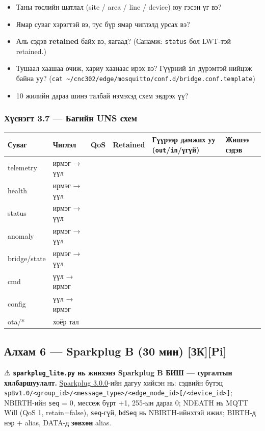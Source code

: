 \begin{itemize}
\tightlist
\item
  Таны төслийн шатлал (site / area / line / device) юу гэсэн үг вэ?
\item
  Ямар суваг хэрэгтэй вэ, тус бүр ямар чиглэлд урсах вэ?
\item
  Аль сэдэв \textbf{retained} байх вэ, яагаад? (Санамж: \texttt{status} бол LWT-тэй retained.)
\item
  Тушаал хаашаа очиж, хариу хаанаас ирэх вэ? Гүүрний \texttt{in} дүрэмтэй нийцэж байна уу? (\texttt{cat\ \textasciitilde{}/cnc302/edge/mosquitto/conf.d/bridge.conf.template})
\item
  10 жилийн дараа шинэ талбай нэмэхэд схем эвдрэх үү?
\end{itemize}

\hypertarget{ux445ux4afux441ux43dux44dux433ux442-3.7-ux431ux430ux433ux438ux439ux43d-uns-ux441ux445ux435ux43c}{%
\subsubsection{Хүснэгт 3.7 --- Багийн UNS схем}\label{ux445ux4afux441ux43dux44dux433ux442-3.7-ux431ux430ux433ux438ux439ux43d-uns-ux441ux445ux435ux43c}}

\begingroup\scriptsize\begin{longtable}[]{@{}llllll@{}}
\toprule
Суваг & Чиглэл & QoS & Retained & Гүүрээр дамжих уу (\texttt{out}/\allowbreak\texttt{in}/үгүй) & Жишээ сэдэв\tabularnewline
\midrule
\endhead
telemetry & ирмэг → үүл & & & &\tabularnewline
health & ирмэг → үүл & & & &\tabularnewline
status & ирмэг → үүл & & & &\tabularnewline
anomaly & ирмэг → үүл & & & &\tabularnewline
bridge/state & ирмэг → үүл & & & &\tabularnewline
cmd & үүл → ирмэг & & & &\tabularnewline
config & үүл → ирмэг & & & &\tabularnewline
ota/* & хоёр тал & & & &\tabularnewline
\bottomrule
\end{longtable}\endgroup

\hypertarget{ux430ux43bux445ux430ux43c-6-sparkplug-b-30-ux43cux438ux43d-ux437ux43api}{%
\subsection{Алхам 6 --- Sparkplug B (30 мин) {[}ЗК{]}{[}Pi{]}}\label{ux430ux43bux445ux430ux43c-6-sparkplug-b-30-ux43cux438ux43d-ux437ux43api}}

⚠ \textbf{\texttt{sparkplug\_\allowbreak{}lite.\allowbreak{}py} нь жинхэнэ Sparkplug B БИШ --- сургалтын хялбаршуулалт.} \href{https://sparkplug.eclipse.org/specification/version/3.0/documents/sparkplug-specification-3.0.0.pdf}{Sparkplug 3.0.0}-ийн дагуу хийсэн нь: сэдвийн бүтэц \texttt{spBv1.\allowbreak{}0/\allowbreak{}\textless{}group\_\allowbreak{}id\textgreater{}/\allowbreak{}\textless{}message\_\allowbreak{}type\textgreater{}/\allowbreak{}\textless{}edge\_\allowbreak{}node\_\allowbreak{}id\textgreater{}{[}/\allowbreak{}\textless{}device\_\allowbreak{}id\textgreater{}{]}}; NBIRTH-ийн \texttt{seq} = 0, мессеж бүрт +1, 255-ын дараа 0; NDEATH нь MQTT Will (QoS 1, retain=false), \texttt{seq}-гүй, \texttt{bdSeq} нь NBIRTH-ийнхтэй ижил; BIRTH-д нэр + alias, DATA-д \textbf{зөвхөн} alias.

